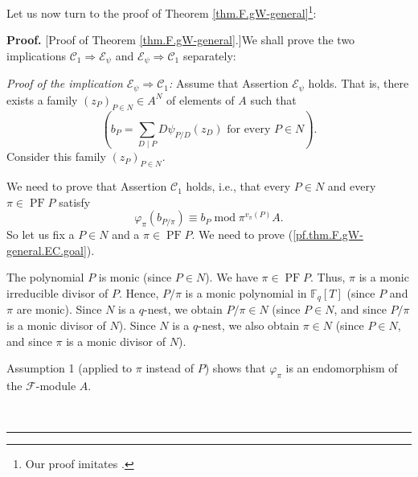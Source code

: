 \documentclass[numbers=enddot,12pt,final,onecolumn,notitlepage]{scrartcl}%
\theoremstyle{definition}
\newenvironment{proof}[1][Proof]{\noindent\textbf{#1.} }{\ \rule{0.5em}{0.5em}}
\let\sumnonlimits\sum
\renewcommand{\sum}{\sumnonlimits\limits}
\begin{document}
Let us now turn to the proof of Theorem \ref{thm.F.gW-general}\footnote{Our
proof imitates \cite[solution to Exercise 2.83]{reiner-hopf}.}:

\begin{proof}
[Proof of Theorem \ref{thm.F.gW-general}.]We shall prove the two implications
$\mathcal{C}_{1}\Longrightarrow\mathcal{E}_{\psi}$ and $\mathcal{E}_{\psi
}\Longrightarrow\mathcal{C}_{1}$ separately:

\textit{Proof of the implication }$\mathcal{E}_{\psi}\Longrightarrow
\mathcal{C}_{1}$\textit{:} Assume that Assertion $\mathcal{E}_{\psi}$ holds.
That is, there exists a family $\left(  z_{P}\right)  _{P\in N}\in A^{N}$ of
elements of $A$ such that%
\begin{equation}
\left(  b_{P}=\sum_{D\mid P}D\psi_{P / D}\left(  z_{D}\right)  \text{ for
every }P\in N\right)  . \label{pf.thm.F.gW-general.EC.ass}%
\end{equation}
Consider this family $\left(  z_{P}\right)  _{P\in N}$.

We need to prove that Assertion $\mathcal{C}_{1}$ holds, i.e., that every
$P\in N$ and every $\pi\in\operatorname{PF}P$ satisfy%
\begin{equation}
\varphi_{\pi}\left(  b_{P / \pi}\right)  \equiv b_{P}\operatorname{mod}%
\pi^{v_{\pi}\left(  P\right)  }A. \label{pf.thm.F.gW-general.EC.goal}%
\end{equation}
So let us fix a $P\in N$ and a $\pi\in\operatorname*{PF}P$. We need to prove
(\ref{pf.thm.F.gW-general.EC.goal}).

The polynomial $P$ is monic (since $P\in N$). We have $\pi\in
\operatorname*{PF}P$. Thus, $\pi$ is a monic irreducible divisor of $P$.
Hence, $P/\pi$ is a monic polynomial in $\mathbb{F}_{q}\left[  T\right]  $
(since $P$ and $\pi$ are monic). Since $N$ is a $q$-nest, we obtain $P/\pi\in
N$ (since $P\in N$, and since $P/\pi$ is a monic divisor of $N$). Since $N$ is
a $q$-nest, we also obtain $\pi\in N$ (since $P\in N$, and since $\pi$ is a
monic divisor of $N$).

Assumption 1 (applied to $\pi$ instead of $P$) shows that $\varphi_{\pi}$ is
an endomorphism of the $\mathcal{F}$-module $A$.


\end{proof}
\end{document}
